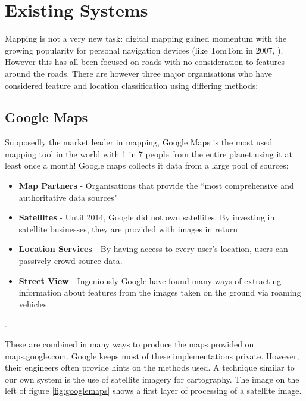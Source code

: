 \chapter{Existing Systems} \label{chapter:systems}
Mapping is not a very new task: digital mapping gained momentum with the growing popularity for personal navigation devices (like TomTom in 2007, \cite{guardian:tomtom}). However this has all been focused on roads with no consideration to features around the roads. There are however three major organisations who have considered feature and location classification using differing methods:











\section{Google Maps}
Supposedly the market leader in mapping, Google Maps is the most used mapping tool in the world with 1 in 7 people from the entire planet using it at least once a month! Google maps collects it data from a large pool of sources:
\begin{itemize}
 \item \textbf{Map Partners} - Organisations that provide the ``most comprehensive and authoritative data sources" \citep{google:makeusof}
\item \textbf{Satellites} - Until 2014, Google did not own satellites. By investing in satellite businesses, they are provided with images in return \citep{google:satellites}
\item \textbf{Location Services} - By having access to every user's location, users can passively crowd source data.
\item \textbf{Street View} - Ingeniously Google have found many ways of extracting information about features from the images taken on the ground via roaming vehicles.
\end{itemize}.

These are combined in many ways to produce the maps provided on maps.google.com. Google keeps most of these implementations private. However, their engineers often provide hints on the methods used. A technique similar to our own system is the use of satellite imagery for cartography. The image on the left of figure \ref{fig:googlemaps} shows a first layer of processing of a satellite image. 

